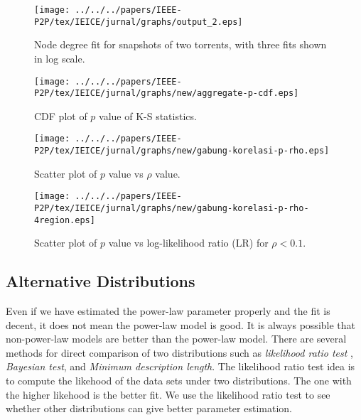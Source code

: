 \begin{figure}[!tb]
\begin{center}
\texttt{[image: ../../../papers/IEEE-P2P/tex/IEICE/jurnal/graphs/output\_2.eps]}
\end{center}
\caption{Node degree fit for snapshots of two torrents, with three fits shown in log scale.} 
\label{fig:fitting}
\end{figure}

\begin{figure}[!tb]
\begin{center}
\texttt{[image: ../../../papers/IEEE-P2P/tex/IEICE/jurnal/graphs/new/aggregate-p-cdf.eps]}
\end{center}
\caption{CDF plot of $p$ value of K-S statistics.} 
\label{fig:cdf-p}
\end{figure}



\begin{figure}[!tb]
\begin{center}
\texttt{[image: ../../../papers/IEEE-P2P/tex/IEICE/jurnal/graphs/new/gabung-korelasi-p-rho.eps]}
\end{center}
\caption{Scatter plot of $p$ value vs $\rho$ value.} 
\label{fig:scatter-pvalue-vs-rho}
\end{figure}

\begin{figure}[!tb]
\begin{center}
\texttt{[image: ../../../papers/IEEE-P2P/tex/IEICE/jurnal/graphs/new/gabung-korelasi-p-rho-4region.eps]}
\end{center}
\caption{Scatter plot of $p$ value vs log-likelihood ratio (LR) for $\rho < 0.1$.} 
\label{fig:scatter-pvalue-vs-lr-for-rho-le-01}
\end{figure}


\subsection{Alternative Distributions}
Even if we have estimated the power-law parameter properly and the fit is decent, it does not mean the power-law model is good.
It is always possible that non-power-law models are better than the power-law model.
There are several methods for direct comparison of two distributions such as \textit{likelihood ratio test} \cite{vuong1989likelihood}, \textit{Bayesian test}, and \textit{Minimum description length}.
The likelihood ratio test idea is to compute the likehood of the data sets under two distributions. 
The one with the higher likehood is the better fit. 
We use the likelihood ratio test to see whether other distributions can give better parameter estimation.

